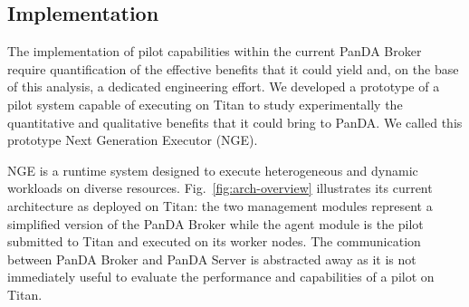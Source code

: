 


\subsection{Implementation}
\label{sec:arch}

The implementation of pilot capabilities within the current PanDA Broker require
quantification of the effective benefits that it could yield and, on the base of
this analysis, a dedicated engineering effort. We developed a prototype of a
pilot system capable of executing on Titan to study experimentally the
quantitative and qualitative benefits that it could bring to PanDA. We called
this prototype Next Generation Executor (NGE).


NGE is a runtime system designed to execute heterogeneous and dynamic workloads
on diverse resources. Fig.~\ref{fig:arch-overview} illustrates its current
architecture as deployed on Titan: the two management modules represent a
simplified version of the PanDA Broker while the agent module is the pilot
submitted to Titan and executed on its worker nodes. The communication between
PanDA Broker and PanDA Server is abstracted away as it is not immediately useful to
evaluate the performance and capabilities of a pilot on Titan.


